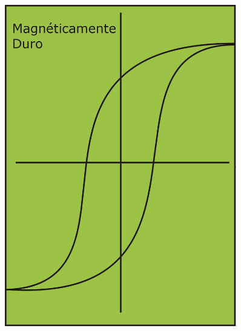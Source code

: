 \begin{figure}[H]
  \centering
  \begin{minipage}[b]{0.47\textwidth}
    \centering
    \vspace{0pt}
     \includegraphics[width=0.9\textwidth]{./Figures/materialesDuros}
  \end{minipage}
  \hfill
  \begin{minipage}[b]{0.47\textwidth}
    \centering
    \vspace{0pt}

\end{minipage}
\end{figure}
